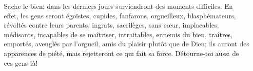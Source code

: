 Sache-le bien: dans les derniers jours surviendront des moments difficiles.
En effet, les gens seront égoïstes, cupides, fanfarons, orgueilleux, blasphémateurs,
	révoltés contre leurs parents, ingrats, sacrilèges, sans cœur, implacables,
	médisants, incapables de se maîtriser, intraitables, ennemis du bien,
	traîtres, emportés, aveuglés par l’orgueil, amis du plaisir plutôt que de Dieu;
	ils auront des apparences de piété, mais rejetteront ce qui fait sa force.
Détourne-toi aussi de ces gens-là!
